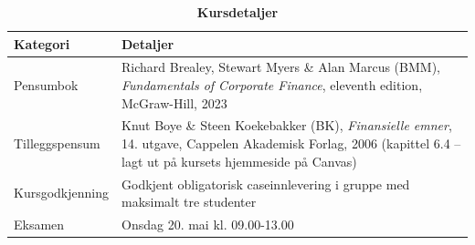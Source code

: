 \begin{table}[H]
\centering
\captionsetup{singlelinecheck=false}
\caption*{\textbf{\large Kursdetaljer}}
\begin{tabularx}{\textwidth}{l X}
\toprule
Kategori & Detaljer \\
\midrule
Pensumbok & Richard Brealey, Stewart Myers \& Alan Marcus (BMM), \emph{Fundamentals of Corporate Finance}, eleventh edition, McGraw-Hill, 2023 \\
Tilleggspensum & Knut Boye \& Steen Koekebakker (BK), \emph{Finansielle emner}, 14. utgave, Cappelen Akademisk Forlag, 2006 (kapittel 6.4 – lagt ut på kursets hjemmeside på Canvas) \\
Kursgodkjenning & Godkjent obligatorisk caseinnlevering i gruppe med maksimalt tre studenter \\
Eksamen & Onsdag 20. mai kl. 09.00-13.00 \\
\bottomrule
\end{tabularx}
\end{table}



